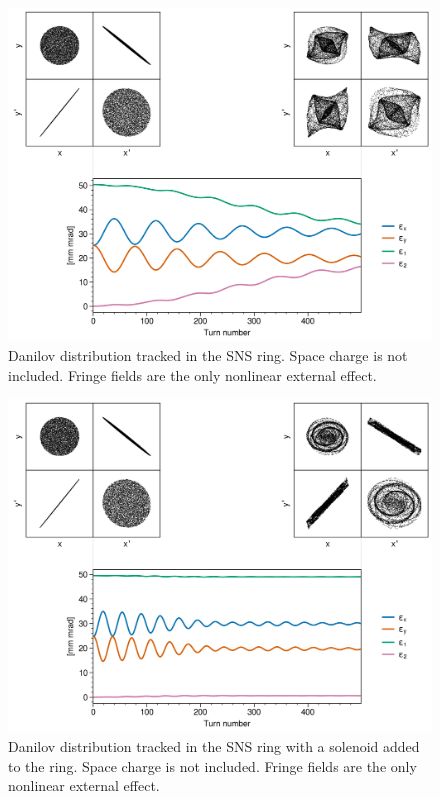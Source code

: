 \begin{figure}[!p]
    \centering
    \includegraphics[width=\textwidth]{Images/chapter3/fringe.png}
    \caption{Danilov distribution tracked in the SNS ring. Space charge is not included. Fringe fields are the only nonlinear external effect.}
    \label{fig:fringe_a}
    \vspace*{3cm}
\end{figure}

\begin{figure}[!p]
    \centering
    \includegraphics[width=\textwidth]{Images/chapter3/fringe_solenoid.png}
    \caption{Danilov distribution tracked in the SNS ring with a solenoid added to the ring. Space charge is not included. Fringe fields are the only nonlinear external effect.}
    \label{fig:fringe_b}
    \vspace*{3cm}
\end{figure}

